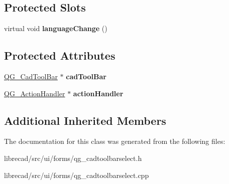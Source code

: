 \subsection*{Protected Slots}
\begin{DoxyCompactItemize}
\item 
\hypertarget{classQG__CadToolBarSelect_ab3404468c7d9fa8dc5c2274fd778256b}{virtual void {\bfseries language\-Change} ()}\label{classQG__CadToolBarSelect_ab3404468c7d9fa8dc5c2274fd778256b}

\end{DoxyCompactItemize}
\subsection*{Protected Attributes}
\begin{DoxyCompactItemize}
\item 
\hypertarget{classQG__CadToolBarSelect_a82ee432c32c613bdf350d55a6a435b11}{\hyperlink{classQG__CadToolBar}{Q\-G\-\_\-\-Cad\-Tool\-Bar} $\ast$ {\bfseries cad\-Tool\-Bar}}\label{classQG__CadToolBarSelect_a82ee432c32c613bdf350d55a6a435b11}

\item 
\hypertarget{classQG__CadToolBarSelect_aebbb6b6d46e64e5437f6ff05681bcbed}{\hyperlink{classQG__ActionHandler}{Q\-G\-\_\-\-Action\-Handler} $\ast$ {\bfseries action\-Handler}}\label{classQG__CadToolBarSelect_aebbb6b6d46e64e5437f6ff05681bcbed}

\end{DoxyCompactItemize}
\subsection*{Additional Inherited Members}


The documentation for this class was generated from the following files\-:\begin{DoxyCompactItemize}
\item 
librecad/src/ui/forms/qg\-\_\-cadtoolbarselect.\-h\item 
librecad/src/ui/forms/qg\-\_\-cadtoolbarselect.\-cpp\end{DoxyCompactItemize}
